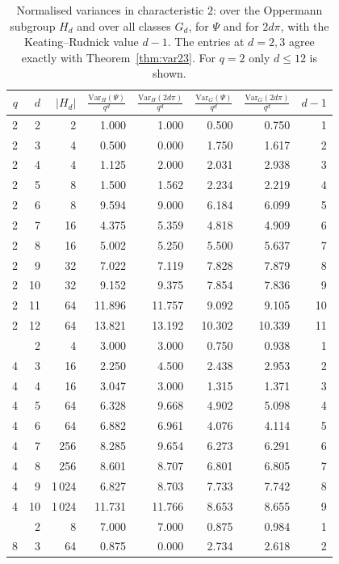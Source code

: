 \begin{table}[tbp]
\centering
\caption{Normalised variances in characteristic $2$: over the Oppermann subgroup $H_d$ and over all classes $G_d$, for $\Psi$ and for $2d\pi$, with the Keating--Rudnick value $d-1$. The entries at $d=2,3$ agree exactly with Theorem~\ref{thm:var23}. For $q=2$ only $d\le12$ is shown.}\label{tab:var}
\begin{tabular}{rrrrrrrr}
\toprule
$q$ & $d$ & $|H_d|$ & $\frac{\mathrm{Var}_{H}(\Psi)}{q^d}$ & $\frac{\mathrm{Var}_{H}(2d\pi)}{q^d}$ & $\frac{\mathrm{Var}_{G}(\Psi)}{q^d}$ & $\frac{\mathrm{Var}_{G}(2d\pi)}{q^d}$ & $d-1$\\
\midrule
2 & 2 & 2 & 1.000 & 1.000 & 0.500 & 0.750 & 1\\
2 & 3 & 4 & 0.500 & 0.000 & 1.750 & 1.617 & 2\\
2 & 4 & 4 & 1.125 & 2.000 & 2.031 & 2.938 & 3\\
2 & 5 & 8 & 1.500 & 1.562 & 2.234 & 2.219 & 4\\
2 & 6 & 8 & 9.594 & 9.000 & 6.184 & 6.099 & 5\\
2 & 7 & 16 & 4.375 & 5.359 & 4.818 & 4.909 & 6\\
2 & 8 & 16 & 5.002 & 5.250 & 5.500 & 5.637 & 7\\
2 & 9 & 32 & 7.022 & 7.119 & 7.828 & 7.879 & 8\\
2 & 10 & 32 & 9.152 & 9.375 & 7.854 & 7.836 & 9\\
2 & 11 & 64 & 11.896 & 11.757 & 9.092 & 9.105 & 10\\
2 & 12 & 64 & 13.821 & 13.192 & 10.302 & 10.339 & 11\\
\addlinespace
4 & 2 & 4 & 3.000 & 3.000 & 0.750 & 0.938 & 1\\
4 & 3 & 16 & 2.250 & 4.500 & 2.438 & 2.953 & 2\\
4 & 4 & 16 & 3.047 & 3.000 & 1.315 & 1.371 & 3\\
4 & 5 & 64 & 6.328 & 9.668 & 4.902 & 5.098 & 4\\
4 & 6 & 64 & 6.882 & 6.961 & 4.076 & 4.114 & 5\\
4 & 7 & 256 & 8.285 & 9.654 & 6.273 & 6.291 & 6\\
4 & 8 & 256 & 8.601 & 8.707 & 6.801 & 6.805 & 7\\
4 & 9 & 1\,024 & 6.827 & 8.703 & 7.733 & 7.742 & 8\\
4 & 10 & 1\,024 & 11.731 & 11.766 & 8.653 & 8.655 & 9\\
\addlinespace
8 & 2 & 8 & 7.000 & 7.000 & 0.875 & 0.984 & 1\\
8 & 3 & 64 & 0.875 & 0.000 & 2.734 & 2.618 & 2\\

\end{tabular}
\end{table}
